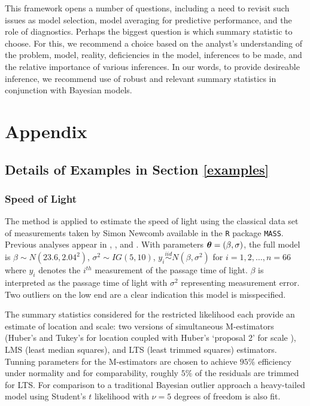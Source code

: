 \documentclass[11pt]{article}
\def\bth{\mbox{\boldmath $\theta$}}
\newcommand{\iid}{\stackrel{iid}{\sim}}
\newcommand{\green}[1]{{\color{green}#1}}
\begin{document}
This framework opens a number of questions, including a need to revisit such issues as model selection, model averaging for predictive performance, and the role of diagnostics.  Perhaps the biggest question is which summary statistic to choose.  For this, we recommend a choice based on the analyst's understanding of the problem, model, reality, deficiencies in the model,  inferences to be made, and the relative importance of various inferences.  \green{In our words, to provide desireable inference, we recommend use of robust and relevant summary statistics in conjunction with Bayesian models.}  


\section{Appendix}
\label{sec:appendix}

\subsection{Details of Examples in Section \ref{examples}}
\subsubsection{Speed of Light}
The method is applied to estimate the speed of light using the classical data set of measurements taken by Simon Newcomb available in the {\tt R} package {\tt MASS}. Previous analyses appear in
\cite{stigler1977}, \cite{chan1980}, and \cite{gelman2004}. With parameters $\bth=(\beta, \sigma)$, the full model is $\beta\sim N(23.6, 2.04^{2})$, $\sigma^{2}\sim IG(5, 10)$, $y_{i}\iid N (\beta, \sigma^{2})$ for $i=1,2,\dots, n=66$ where $y_{i}$ denotes the $i^{th}$ measurement of the passage time of light. $\beta$ is interpreted as the passage time of light with
$\sigma^{2}$ representing measurement error. Two outliers on the low end are a clear indication 
this model is misspecified. 

The summary statistics considered for the restricted likelihood each provide an estimate of location and scale: two versions of simultaneous M-estimators (Huber's and Tukey's for location coupled with Huber's `proposal 2'  for scale \citep{Huber1964}), LMS (least median squares), and LTS (least trimmed squares) estimators. Tunning parameters for the M-estimators are chosen to achieve $95\%$ efficiency under normality and for comparability, roughly $5\%$ of the residuals are trimmed for LTS. For comparison to a traditional Bayesian outlier approach a heavy-tailed model using Student's $t$ likelihood with $\nu=5$ degrees of freedom is also fit. %
\end{document}
